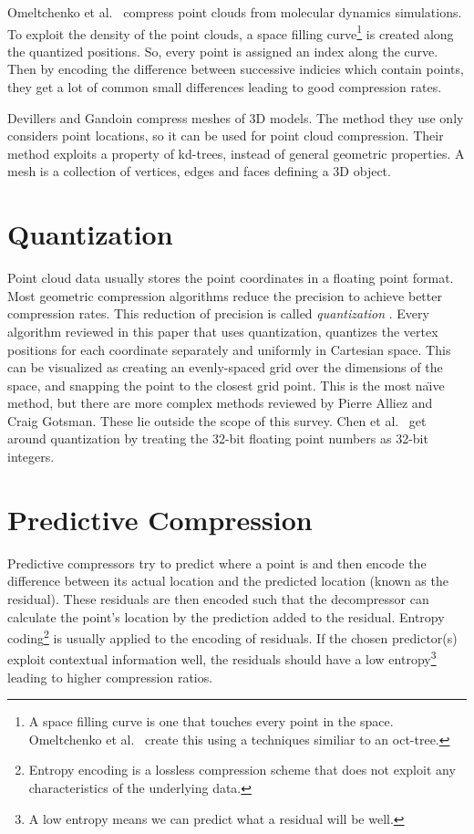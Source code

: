 \documentclass[11pt,twocolumn]{article}
\begin{document}
Omeltchenko et al.~\cite{omeltchenko2000sls} compress point clouds from
molecular dynamics simulations. To exploit the density of the point clouds, a
space filling curve\footnote{A space filling curve is one that touches every
  point in the space. Omeltchenko et al.~\cite{omeltchenko2000sls} create this
  using a techniques similiar to an oct-tree.} is created along the quantized
positions. So, every point is assigned an index along the curve. Then by
encoding the difference between successive indicies which contain points, they
get a lot of common small differences leading to good compression rates.

Devillers and Gandoin \cite{devillers2000gci} compress meshes of 3D
models. The method they use only considers point locations, so it can be used
for point cloud compression. Their method exploits a property of kd-trees,
instead of general geometric properties. A mesh is a collection of vertices,
edges and faces defining a 3D object.


\section{Quantization}

Point cloud data usually stores the point coordinates in a floating point
format. Most geometric compression algorithms reduce the precision to achieve
better compression rates. This reduction of precision is called
\emph{quantization} \cite{ag-racm-03}. Every algorithm reviewed in this paper
that uses quantization, quantizes the vertex positions for each coordinate
separately and uniformly in Cartesian space. This can be visualized as
creating an evenly-spaced grid over the dimensions of the space, and snapping
the point to the closest grid point. This is the most na\"{\i}ve method, but
there are more complex methods reviewed by Pierre Alliez and Craig
Gotsman\cite{ag-racm-03}. These lie outside the scope of this survey. Chen et
al.~\cite{chen2005lcp} get around quantization by treating the 32-bit floating
point numbers as 32-bit integers.


\section{Predictive Compression}

Predictive compressors try to predict where a point is and then encode the
difference between its actual location and the predicted location (known as
the residual). These residuals are then encoded such that the decompressor can
calculate the point's location by the prediction added to the
residual. Entropy coding\footnote{Entropy encoding is a lossless compression
  scheme that does not exploit any characteristics of the underlying data.} is
usually applied to the encoding of residuals. If the chosen predictor(s)
exploit contextual information well, the residuals should have a low
entropy\footnote{A low entropy means we can predict what a residual will be
  well.}  leading to higher compression ratios.
\end{document}
